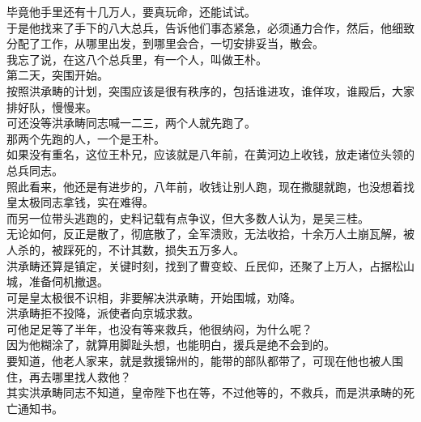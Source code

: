 \begin{multicols}{\theparacolNo}
毕竟他手里还有十几万人，要真玩命，还能试试。\\

于是他找来了手下的八大总兵，告诉他们事态紧急，必须通力合作，然后，他细致分配了工作，从哪里出发，到哪里会合，一切安排妥当，散会。\\

我忘了说，在这八个总兵里，有一个人，叫做王朴。\\

第二天，突围开始。\\

按照洪承畴的计划，突围应该是很有秩序的，包括谁进攻，谁佯攻，谁殿后，大家排好队，慢慢来。\\

可还没等洪承畴同志喊一二三，两个人就先跑了。\\

那两个先跑的人，一个是王朴。\\

如果没有重名，这位王朴兄，应该就是八年前，在黄河边上收钱，放走诸位头领的总兵同志。\\

照此看来，他还是有进步的，八年前，收钱让别人跑，现在撒腿就跑，也没想着找皇太极同志拿钱，实在难得。\\

而另一位带头逃跑的，史料记载有点争议，但大多数人认为，是吴三桂。\\

无论如何，反正是散了，彻底散了，全军溃败，无法收拾，十余万人土崩瓦解，被人杀的，被踩死的，不计其数，损失五万多人。\\

洪承畴还算是镇定，关键时刻，找到了曹变蛟、丘民仰，还聚了上万人，占据松山城，准备伺机撤退。\\

可是皇太极很不识相，非要解决洪承畴，开始围城，劝降。\\

洪承畴拒不投降，派使者向京城求救。\\

可他足足等了半年，也没有等来救兵，他很纳闷，为什么呢？\\

因为他糊涂了，就算用脚趾头想，也能明白，援兵是绝不会到的。\\

要知道，他老人家来，就是救援锦州的，能带的部队都带了，可现在他也被人围住，再去哪里找人救他？\\

其实洪承畴同志不知道，皇帝陛下也在等，不过他等的，不救兵，而是洪承畴的死亡通知书。\\


\end{multicols}
